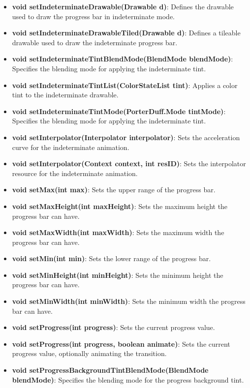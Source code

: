 \documentclass{report}
\begin{document}
\begin{itemize}
\begin{itemize}
                \item \textbf{void setIndeterminateDrawable(Drawable d)}: Defines the drawable used to draw the progress bar in indeterminate mode.
                \item \textbf{void setIndeterminateDrawableTiled(Drawable d)}: Defines a tileable drawable used to draw the indeterminate progress bar.
                \item \textbf{void setIndeterminateTintBlendMode(BlendMode blendMode)}: Specifies the blending mode for applying the indeterminate tint.
                \item \textbf{void setIndeterminateTintList(ColorStateList tint)}: Applies a color tint to the indeterminate drawable.
                \item \textbf{void setIndeterminateTintMode(PorterDuff.Mode tintMode)}: Specifies the blending mode for applying the indeterminate tint.
                \item \textbf{void setInterpolator(Interpolator interpolator)}: Sets the acceleration curve for the indeterminate animation.
                \item \textbf{void setInterpolator(Context context, int resID)}: Sets the interpolator resource for the indeterminate animation.
                \item \textbf{void setMax(int max)}: Sets the upper range of the progress bar.
                \item \textbf{void setMaxHeight(int maxHeight)}: Sets the maximum height the progress bar can have.
                \item \textbf{void setMaxWidth(int maxWidth)}: Sets the maximum width the progress bar can have.
                \item \textbf{void setMin(int min)}: Sets the lower range of the progress bar.
                \item \textbf{void setMinHeight(int minHeight)}: Sets the minimum height the progress bar can have.
                \item \textbf{void setMinWidth(int minWidth)}: Sets the minimum width the progress bar can have.
                \item \textbf{void setProgress(int progress)}: Sets the current progress value.
                \item \textbf{void setProgress(int progress, boolean animate)}: Sets the current progress value, optionally animating the transition.
                \item \textbf{void setProgressBackgroundTintBlendMode(BlendMode blendMode)}: Specifies the blending mode for the progress background tint.

\end{itemize}
\end{itemize}
\end{document}
